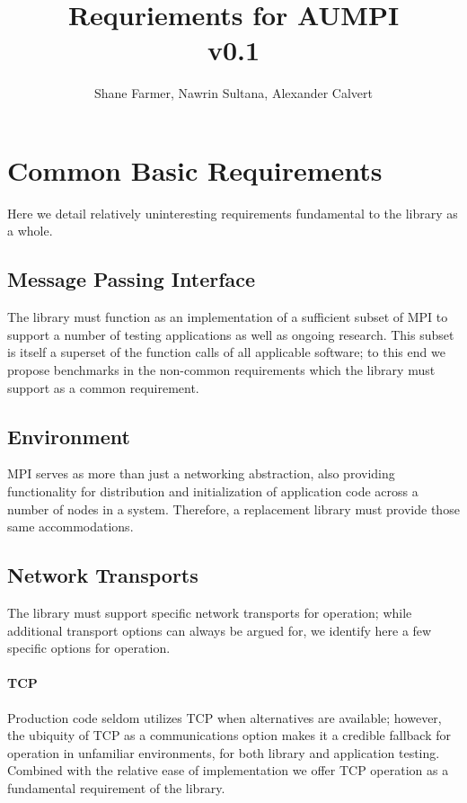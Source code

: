 \documentclass{article}
\title{Requriements for AUMPI\\ v0.1}
\author{Shane Farmer, Nawrin Sultana, Alexander Calvert}
\begin{document}
\maketitle
\tableofcontents


\section{Common Basic Requirements}

Here we detail relatively uninteresting requirements fundamental to the library as a whole.

\subsection{Message Passing Interface}

The library must function as an implementation of a sufficient subset of MPI to support a number of testing applications as well as ongoing research.  This subset is itself a superset of the function calls of all applicable software; to this end we propose benchmarks in the non-common requirements which the library must support as a common requirement.

\subsection{Environment}

MPI serves as more than just a networking abstraction, also providing functionality for distribution and initialization of application code across a number of nodes in a system.  Therefore, a replacement library must provide those same accommodations.

\subsection{Network Transports}

The library must support specific network transports for operation; while additional transport options can always be argued for, we identify here a few specific options for operation.

\paragraph{TCP}  Production code seldom utilizes TCP when alternatives are available; however, the ubiquity of TCP as a communications option makes it a credible fallback for operation in unfamiliar environments, for both library and application testing.  Combined with the relative ease of implementation we offer TCP operation as a fundamental requirement of the library.
\end{document}
